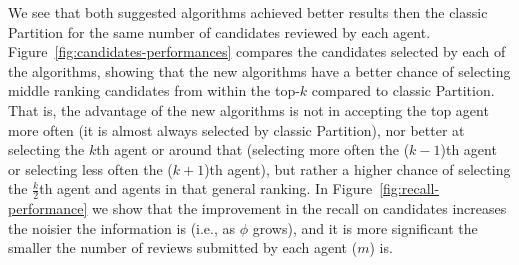 \documentclass[letterpaper]{article} %
\begin{document}
We see that both suggested algorithms achieved better results then the classic Partition for the same number of candidates reviewed by each agent. Figure~\ref{fig:candidates-performances} compares the candidates selected by each of the algorithms, showing that the new algorithms have a better chance of selecting middle ranking candidates from within the top-$k$ compared to classic Partition. That is, the advantage of the new algorithms is not in accepting the top agent more often (it is almost always selected by classic Partition), nor better at selecting the $k$th agent or around that (selecting more often the ($k-1$)th agent or selecting less often the ($k+1$)th agent), but rather a higher chance of selecting the $\frac{k}{2}$th agent and agents in that general ranking. In Figure~\ref{fig:recall-performance} we show that the improvement in the recall on candidates increases the noisier the information is 
(i.e., as $\phi$ grows), and it is more significant the smaller the number of reviews submitted by each agent ($m$) is.
\end{document}
